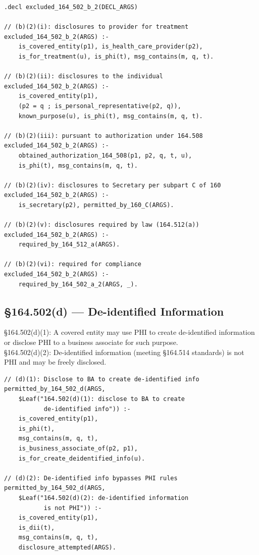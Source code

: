 \documentclass[11pt,letterpaper]{article}
\begin{document}
\begin{lstlisting}[style=soufflestyle,caption={\S 164.502(b)(2) --- minimum necessary exceptions}]
.decl excluded_164_502_b_2(DECL_ARGS)

// (b)(2)(i): disclosures to provider for treatment
excluded_164_502_b_2(ARGS) :-
    is_covered_entity(p1), is_health_care_provider(p2),
    is_for_treatment(u), is_phi(t), msg_contains(m, q, t).

// (b)(2)(ii): disclosures to the individual
excluded_164_502_b_2(ARGS) :-
    is_covered_entity(p1),
    (p2 = q ; is_personal_representative(p2, q)),
    known_purpose(u), is_phi(t), msg_contains(m, q, t).

// (b)(2)(iii): pursuant to authorization under 164.508
excluded_164_502_b_2(ARGS) :-
    obtained_authorization_164_508(p1, p2, q, t, u),
    is_phi(t), msg_contains(m, q, t).

// (b)(2)(iv): disclosures to Secretary per subpart C of 160
excluded_164_502_b_2(ARGS) :-
    is_secretary(p2), permitted_by_160_C(ARGS).

// (b)(2)(v): disclosures required by law (164.512(a))
excluded_164_502_b_2(ARGS) :-
    required_by_164_512_a(ARGS).

// (b)(2)(vi): required for compliance
excluded_164_502_b_2(ARGS) :-
    required_by_164_502_a_2(ARGS, _).
\end{lstlisting}

\subsection{\S 164.502(d) --- De-identified Information}
\label{sec:502d}

\begin{hipaabox}
\S 164.502(d)(1): A covered entity may use PHI to create de-identified information or disclose PHI to a business associate for such purpose.\\
\S 164.502(d)(2): De-identified information (meeting \S 164.514 standards) is not PHI and may be freely disclosed.
\end{hipaabox}

\begin{lstlisting}[style=soufflestyle,caption={\S 164.502(d) --- de-identified info}]
// (d)(1): Disclose to BA to create de-identified info
permitted_by_164_502_d(ARGS,
    $Leaf("164.502(d)(1): disclose to BA to create
           de-identified info")) :-
    is_covered_entity(p1),
    is_phi(t),
    msg_contains(m, q, t),
    is_business_associate_of(p2, p1),
    is_for_create_deidentified_info(u).

// (d)(2): De-identified info bypasses PHI rules
permitted_by_164_502_d(ARGS,
    $Leaf("164.502(d)(2): de-identified information
           is not PHI")) :-
    is_covered_entity(p1),
    is_dii(t),
    msg_contains(m, q, t),
    disclosure_attempted(ARGS).
\end{lstlisting}
\end{document}
